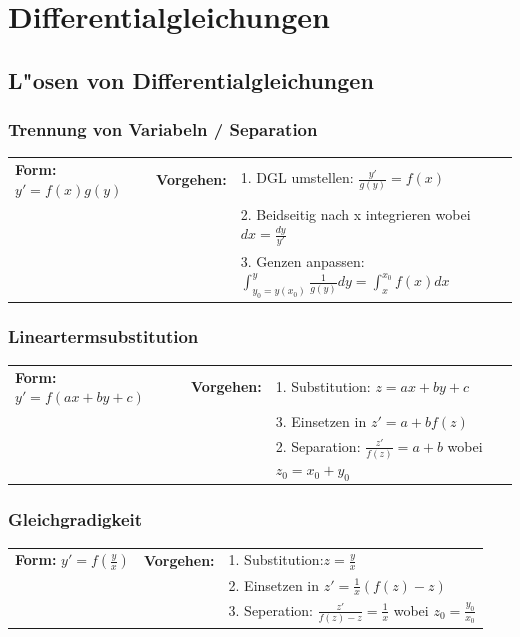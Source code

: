 \section{Differentialgleichungen }

\subsection{L"osen von Differentialgleichungen}

\subsubsection{Trennung von Variabeln / Separation }
\begin{tabular}{p{4cm}p{1.5cm}p{10.5cm}}
\textbf{Form:} $y' = f(x) g(y)$ &
\textbf{Vorgehen:}              &
1. DGL umstellen: $\frac{y'}{g(y)} = f(x)$ \\ &&
2. Beidseitig nach x integrieren wobei $dx = \frac{dy}{y'}$ \\ &&
3. Genzen anpassen: $\int_{y_0=y(x_0)}^{y} \frac{1}{g(y)} dy =
\int_{x}^{x_0}f(x) dx$
\end{tabular}

\subsubsection{Lineartermsubstitution }
\begin{tabular}{p{4cm}p{1.5cm}p{10.5cm}}
\textbf{Form:} $y'=f(ax+by+c)$   &
\textbf{Vorgehen:}               &
1. Substitution: $z=ax+by+c$ \\ &&
3. Einsetzen in $z'=a+bf(z)$\\ &&
2. Separation: $\frac{z'}{f(z)} = a + b$ wobei $z_0 = x_0 + y_0$
\end{tabular}

\subsubsection{Gleichgradigkeit}
\begin{tabular}{p{4cm}p{1.5cm}p{10.5cm}}
\textbf{Form:} $y'=f(\frac{y}{x})$ &
\textbf{Vorgehen:}                &
1. Substitution:\quad $z=\frac{y}{x}$\\ &&
2. Einsetzen in $z'=\frac{1}{x}(f(z)-z)$\\ &&
3. Seperation: $\frac{z'}{f(z)-z} = \frac{1}{x}$ wobei $z_0 = \frac{y_0}{x_0}$ 
\end{tabular}

